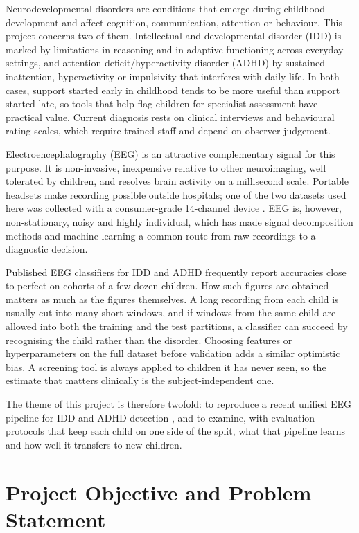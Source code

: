 \documentclass[11pt,a4paper]{article}
\begin{document}
Neurodevelopmental disorders are conditions that emerge during childhood
development and affect cognition, communication, attention or behaviour.
This project concerns two of them. Intellectual and developmental
disorder (IDD) is marked by limitations in reasoning and in adaptive
functioning across everyday settings, and attention-deficit/hyperactivity
disorder (ADHD) by sustained inattention, hyperactivity or impulsivity that
interferes with daily life. In both cases, support
started early in childhood tends to be more useful than support started late,
so tools that help flag children for specialist assessment have practical
value. Current diagnosis rests on clinical interviews and behavioural rating
scales, which require trained staff and depend on observer judgement.

Electroencephalography (EEG) is an attractive complementary signal for this
purpose. It is non-invasive, inexpensive relative to other neuroimaging, well
tolerated by children, and resolves brain activity on a millisecond scale.
Portable headsets make recording possible outside hospitals; one of the two
datasets used here was collected with a consumer-grade 14-channel device
\cite{sareen2020data}. EEG is, however, non-stationary, noisy and highly
individual, which has made signal decomposition methods and machine learning a
common route from raw recordings to a diagnostic decision.

Published EEG classifiers for IDD and ADHD frequently report accuracies close
to perfect on cohorts of a few dozen children. How such figures are obtained
matters as much as the figures themselves. A long recording from each child is
usually cut into many short windows, and if windows from the same child are
allowed into both the training and the test partitions, a classifier can
succeed by recognising the child rather than the disorder. Choosing features
or hyperparameters on the full dataset before validation adds a similar
optimistic bias. A screening tool is always applied to children it
has never seen, so the estimate that matters clinically is the
subject-independent one.

The theme of this project is therefore twofold: to reproduce a recent unified
EEG pipeline for IDD and ADHD detection \cite{chandela2025}, and to examine,
with evaluation protocols that keep each child on one side of the split, what
that pipeline learns and how well it transfers to new children.

\section{Project Objective and Problem Statement}
\end{document}

